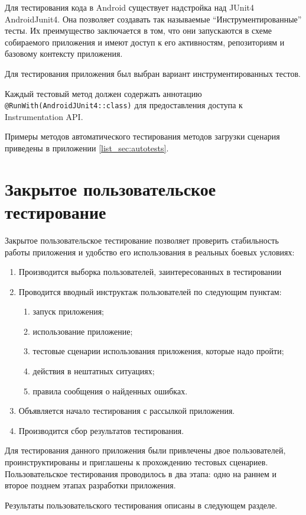 Для тестирования кода в Android существует надстройка над JUnit4 \textemdash\space AndroidJunit4. Она позволяет создавать так называемые ``Инструментированные'' тесты. Их преимущество заключается в том, что они запускаются в схеме собираемого приложения и имеют доступ к его активностям, репозиториям и базовому контексту приложения.

Для тестирования приложения был выбран вариант инструментированных тестов.

Каждый тестовый метод должен содержать аннотацию \lstinline{@RunWith(AndroidJUnit4::class)} для предоставления доступа к Instrumentation API.

Примеры методов автоматического тестирования методов загрузки сценария приведены в приложении \ref{list_sec:autotests}.

\section{Закрытое пользовательское тестирование}
\label{sec:usertesting}
Закрытое пользовательское тестирование позволяет проверить стабильность работы приложения и удобство его использования в реальных боевых условиях:
\begin{enumerate}
	\item Производится выборка пользователей, заинтересованных в тестировании
	\item Проводится вводный инструктаж пользователей по следующим пунктам:
	\begin{enumerate}
		\item запуск приложения;
		\item использование приложение;
		\item тестовые сценарии использования приложения, которые надо пройти;
		\item действия в нештатных ситуациях;
		\item правила сообщения о найденных ошибках.
	\end{enumerate}
	\item Объявляется начало тестирования с рассылкой приложения.
	\item Производится сбор результатов тестирования.
\end{enumerate}
\smallskip
Для тестирования данного приложения были привлечены двое пользователей, проинструктированы и приглашены к прохождению тестовых сценариев.
Пользовательское тестирования проводилось в два этапа: одно на раннем и второе позднем этапах разработки приложения.

Результаты пользовательского тестирования описаны в следующем разделе.

